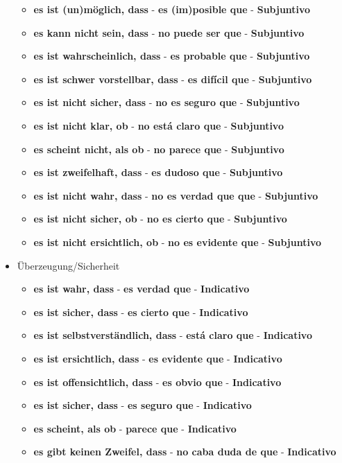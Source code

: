 \documentclass{article}
\begin{document}
\begin{multicols}{2}
\begin{itemize}
		\begin{itemize}
			\item{\textbf{es ist (un)möglich, dass} - \textbf{es (im)posible que} - \textbf{Subjuntivo}}
			\item{\textbf{es kann nicht sein, dass} - \textbf{no puede ser que} - \textbf{Subjuntivo}}
			\item{\textbf{es ist wahrscheinlich, dass} - \textbf{es probable que} - \textbf{Subjuntivo}}
			\item{\textbf{es ist schwer vorstellbar, dass} - \textbf{es difícil que} - \textbf{Subjuntivo}}
			\item{\textbf{es ist nicht sicher, dass} - \textbf{no es seguro que} - \textbf{Subjuntivo}}
			\item{\textbf{es ist nicht klar, ob} - \textbf{no está claro que} - \textbf{Subjuntivo}}
			\item{\textbf{es scheint nicht, als ob} - \textbf{no parece que} - \textbf{Subjuntivo}}
			\item{\textbf{es ist zweifelhaft, dass} - \textbf{es dudoso que} - \textbf{Subjuntivo}}
			\item{\textbf{es ist nicht wahr, dass} - \textbf{no es verdad que que} - \textbf{Subjuntivo}}
			\item{\textbf{es ist nicht sicher, ob} - \textbf{no es cierto que} - \textbf{Subjuntivo}}
			\item{\textbf{es ist nicht ersichtlich, ob} - \textbf{no es evidente que} - \textbf{Subjuntivo}}

		\end{itemize}
		\item{Überzeugung/Sicherheit}
		\begin{itemize}
			\item{\textbf{es ist wahr, dass} - \textbf{es verdad que} - \textbf{Indicativo}}
			\item{\textbf{es ist sicher, dass} - \textbf{es cierto que} - \textbf{Indicativo}}
			\item{\textbf{es ist selbstverständlich, dass} - \textbf{está claro que} - \textbf{Indicativo}}
			\item{\textbf{es ist ersichtlich, dass} - \textbf{es evidente que} - \textbf{Indicativo}}
			\item{\textbf{es ist offensichtlich, dass} - \textbf{es obvio que} - \textbf{Indicativo}}
			\item{\textbf{es ist sicher, dass} - \textbf{es seguro que} - \textbf{Indicativo}}
			\item{\textbf{es scheint, als ob} - \textbf{parece que} - \textbf{Indicativo}}
			\item{\textbf{es gibt keinen Zweifel, dass} - \textbf{no caba duda de que} - \textbf{Indicativo}}	
		\end{itemize}
	\end{itemize}
	
		\end{multicols}
	
\end{document}
